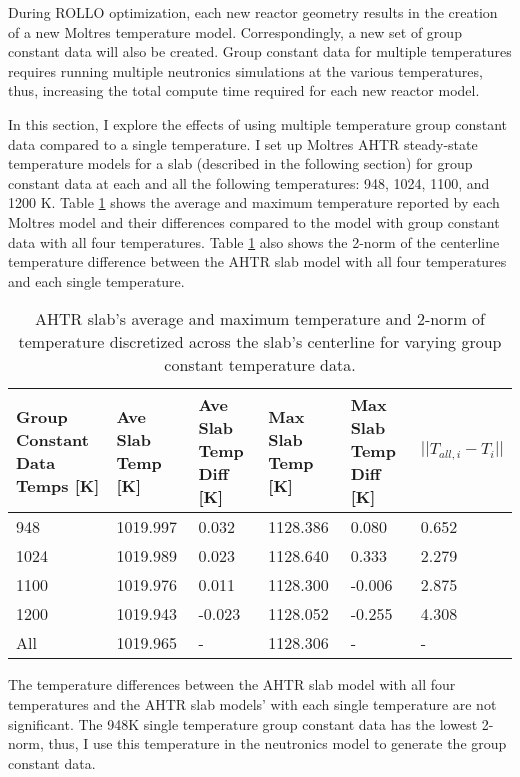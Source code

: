 During ROLLO optimization, each new reactor geometry results in the creation of 
a new Moltres temperature model. 
Correspondingly, a new set of group constant data will also be created. 
Group constant data for multiple temperatures requires running multiple neutronics 
simulations at the various temperatures, thus, increasing the total compute time 
required for each new reactor model. 

In this section, I explore the effects of using multiple temperature group 
constant data compared to a single temperature.
I set up Moltres AHTR steady-state temperature models for a slab (described in the 
following section) for group constant data at each and all the following temperatures:
948, 1024, 1100, and 1200 K. 
Table \ref{tab:moltres-group-constant-temps} shows the average and maximum temperature 
reported by each Moltres model and their differences compared to the model with 
group constant data with all four temperatures. 
Table \ref{tab:moltres-group-constant-temps} also shows the 2-norm of the 
centerline temperature difference between the AHTR slab model with all four temperatures 
and each single temperature. 
\begin{table}[H]
    \centering
    \onehalfspacing
    \caption{AHTR slab's average and maximum temperature and 2-norm of temperature 
    discretized across the slab's centerline for varying group constant temperature data.}
	\label{tab:moltres-group-constant-temps}
    \scriptsize
    \begin{tabular}{p{2.5cm}p{2cm}p{2.4cm}p{2cm}p{2.4cm}p{2cm}}
    \hline 
    \textbf{Group Constant Data Temps [K]}& \textbf{Ave Slab Temp [K]}& 
    \textbf{Ave Slab Temp Diff [K]}& \textbf{Max Slab Temp [K]} & 
    \textbf{Max Slab Temp Diff [K]} & $||T_{all, i} - T_{i}||$ \\ 
    \hline 
     948 & 1019.997 &  0.032 & 1128.386 &  0.080 & 0.652\\
    1024 & 1019.989 &  0.023 & 1128.640 &  0.333 & 2.279 \\
    1100 & 1019.976 &  0.011 & 1128.300 & -0.006 & 2.875 \\
    1200 & 1019.943 & -0.023 & 1128.052 & -0.255 & 4.308 \\
    All  & 1019.965 &  -     & 1128.306 & -      & -    \\
    \hline
    \end{tabular}
\end{table}
The temperature differences between the AHTR slab model with all four temperatures 
and the AHTR slab models' with each single temperature are not significant. 
The 948K single temperature group constant data has the lowest 2-norm, thus, I 
use this temperature in the neutronics model to generate the group constant data. 

